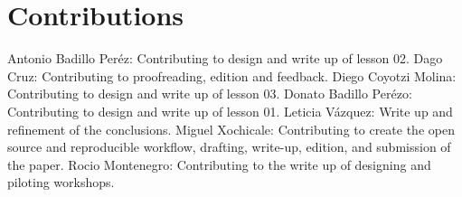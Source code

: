 \documentclass[conference]{IEEEtran}
\begin{document}
\section*{Contributions}
Antonio Badillo Per\'ez: Contributing to design and write up of lesson 02.
Dago Cruz: Contributing to proofreading, edition and feedback.
Diego Coyotzi Molina: Contributing to design and write up of lesson 03.
Donato Badillo Per\'ezo: Contributing to design and write up of lesson 01.
Leticia V\'azquez: Write up and refinement of the conclusions.
Miguel Xochicale: Contributing to create the open source and reproducible workflow, drafting, write-up, edition, and submission of the paper. 
Rocio Montenegro: Contributing to the write up of designing and piloting workshops. 


\end{document}
